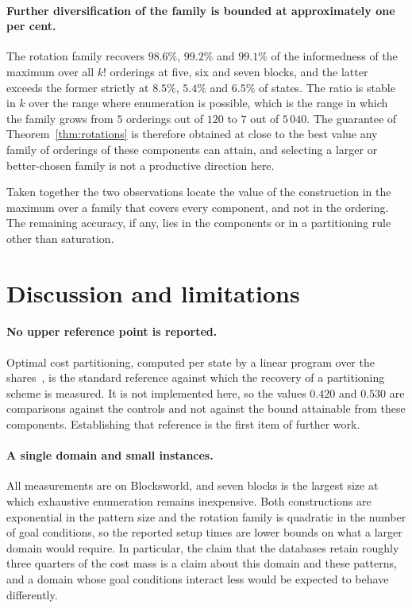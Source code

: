 \documentclass[10pt,twocolumn,a4paper]{article}
\theoremstyle{plain}
\theoremstyle{definition}
\theoremstyle{remark}
\begin{document}
\paragraph{Further diversification of the family is bounded at approximately
one per cent.}
The rotation family recovers $98.6\%$, $99.2\%$ and $99.1\%$ of the
informedness of the maximum over all $k!$ orderings at five, six and seven
blocks, and the latter exceeds the former strictly at $8.5\%$, $5.4\%$ and
$6.5\%$ of states. The ratio is stable in $k$ over the range where enumeration
is possible, which is the range in which the family grows from $5$ orderings
out of $120$ to $7$ out of $5\,040$. The guarantee of
Theorem~\ref{thm:rotations} is therefore obtained at close to the best value
any family of orderings of these components can attain, and selecting a larger
or better-chosen family is not a productive direction here.

Taken together the two observations locate the value of the construction in the
maximum over a family that covers every component, and not in the ordering. The
remaining accuracy, if any, lies in the components or in a partitioning rule
other than saturation.

\section{Discussion and limitations}
\label{sec:discussion}

\paragraph{No upper reference point is reported.}
Optimal cost partitioning, computed per state by a linear program over the
shares~\cite{katz2008,pommerening2014}, is the standard reference against which
the recovery of a partitioning scheme is measured. It is not implemented here,
so the values $0.420$ and $0.530$ are comparisons against the controls and not
against the bound attainable from these components. Establishing that reference
is the first item of further work.

\paragraph{A single domain and small instances.}
All measurements are on Blocksworld, and seven blocks is the largest size at
which exhaustive enumeration remains inexpensive. Both constructions are
exponential in the pattern size and the rotation family is quadratic in the
number of goal conditions, so the reported setup times are lower bounds on what
a larger domain would require. In particular, the claim that the databases
retain roughly three quarters of the cost mass is a claim about this domain and
these patterns, and a domain whose goal conditions interact less would be
expected to behave differently.
\end{document}
